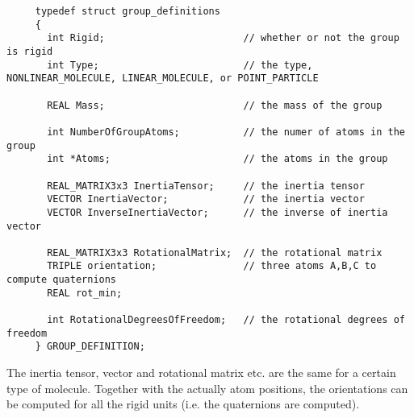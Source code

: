 \begin{footnotesize}
\begin{verbatim}
     typedef struct group_definitions
     {
       int Rigid;                        // whether or not the group is rigid
       int Type;                         // the type, NONLINEAR_MOLECULE, LINEAR_MOLECULE, or POINT_PARTICLE

       REAL Mass;                        // the mass of the group

       int NumberOfGroupAtoms;           // the numer of atoms in the group
       int *Atoms;                       // the atoms in the group

       REAL_MATRIX3x3 InertiaTensor;     // the inertia tensor
       VECTOR InertiaVector;             // the inertia vector
       VECTOR InverseInertiaVector;      // the inverse of inertia vector

       REAL_MATRIX3x3 RotationalMatrix;  // the rotational matrix
       TRIPLE orientation;               // three atoms A,B,C to compute quaternions
       REAL rot_min;

       int RotationalDegreesOfFreedom;   // the rotational degrees of freedom
     } GROUP_DEFINITION;
\end{verbatim}
\end{footnotesize}
The inertia tensor, vector and rotational matrix etc. are the same for a certain type of molecule. Together with the actually atom positions, the orientations
can be computed for all the rigid units (i.e. the quaternions are computed).

